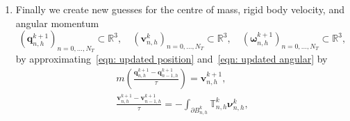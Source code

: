 \documentclass[a4paper]{amsart}
\numberwithin{equation}{section}
\newcommand{\grad}{\nabla}
\newcommand{\Div}{\nabla \cdot}
\theoremstyle{plain}
\newcommand{\mbf}[1]{\mathbf{#1}}
\newcommand{\mbb}[1]{\mathbb{#1}}
\begin{document}
\begin{enumerate}
\begin{subequations}
\begin{gather}
\begin{aligned}
            + \rho \int_{\Omega_{n,h}^k} (\mbf{V}_{n,h}^k \cdot \grad \boldsymbol{\phi}_{n,h}^k) \mbf{u}_{n,h}^k + \mu \int_{\Omega_h} \grad \mbf{u}_{n,h}^k : \grad \boldsymbol{\phi}_{n,h}^k = 0,
        \end{aligned}\label{eqn: finite element navier stokes1}\\
            \int_{\Omega_{n,h}^k} \psi_{n,h}^k \Div \mbf{u}_{n,h}^k = 0, \label{eqn: finite element navier stokes2}
        \end{gather}
        \label{eqn: finite element navier stokes}
    \end{subequations}
    for all $(\boldsymbol{\phi}_{n,h}^k, \psi_{n,h}^k) \in \underline{\mbb{P}^2}(\Omega_{n,h}^k) \times \mbb{P}^1(\Omega_{n,h}^k)$ and such that
    \begin{equation}
        \begin{gathered}
            \mbf{u}_{n,h}^k = \mbf{v}^k_{n} + \boldsymbol{\omega}^k_{n} \times (\mbf{x} - \mbf{q}^k_{n}), \quad \text{on } \partial B_{n,h}^k,\\
            \mbf{u}_{n,h}^k = 0, \quad \text{on } \Gamma_h.\\
        \end{gathered}
        \label{eqn: finite element boundary conditions}
    \end{equation}
    Here $\boldsymbol{\phi}_{n-1,h}^k \in \underline{\mbb{P}^2}(\Omega_{n-1,h}^k)$ denotes the finite element function with the same nodal values as the test function $\boldsymbol{\phi}_{n,h}^k \in \underline{\mbb{P}^2}(\Omega_{n,h}^k)$ but defined on the previous spatial domain, $\Omega_{n-1,h}^k$.
    \item Finally we create new guesses for the centre of mass, rigid body velocity, and angular momentum
    \[(\mbf{q}^{k+1}_{n,h})_{n=0,\ldots,N_T} \subset \mbb{R}^3, \quad (\mbf{v}^k_{n,h})_{n=0,\ldots,N_T} \subset \mbb{R}^3 , \quad (\boldsymbol{\omega}^{k+1}_{n,h})_{n=0,\ldots,N_T} \subset \mbb{R}^3,\]
    by approximating~\eqref{eqn: updated position} and~\eqref{eqn: updated angular} by
    \begin{subequations}
    \label{eqn: finite element ODEs}
        \begin{gather}
        m\left(\frac{\mbf{q}_{n,h}^{k+1} - \mbf{q}_{n-1,h}^{k+1}}{\tau}\right) = \mbf{v}_{n,h}^{k+1}, \label{eqn: finite element mass ODE}\\
        \frac{\mbf{v}_{n,h}^{k+1} - \mbf{v}_{n-1,h}^{k+1}}{\tau} = -\int_{\partial B_{n,h}^k} \mbb{T}_{n,h}^k \boldsymbol{\nu}_{n,h}^k, \label{eqn: finite element velocity ODE}\\

\end{gather}
\end{subequations}
\end{enumerate}
\end{document}
